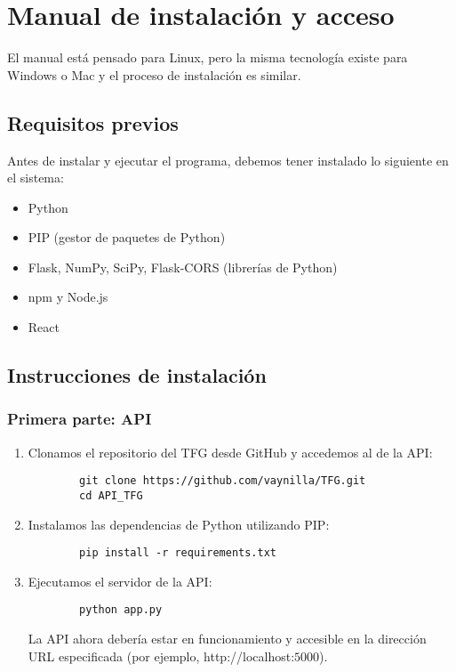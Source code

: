 \chapter{Manual de instalación y acceso}\label{ap:apendice1}
El manual está pensado para Linux, pero la misma tecnología existe para Windows o Mac y el proceso de instalación es similar.
\section{Requisitos previos}
Antes de instalar y ejecutar el programa, debemos tener instalado lo siguiente en el sistema:
\begin{itemize}
	\item Python
	\item PIP (gestor de paquetes de Python)
	\item Flask, NumPy, SciPy, Flask-CORS (librerías de Python)
	\item npm y Node.js
	\item React
\end{itemize}
\section{Instrucciones de instalación}
\subsection{Primera parte: API}
\begin{enumerate}
	\item Clonamos el repositorio del TFG desde GitHub y accedemos al de la API:
	\begin{verbatim}
		git clone https://github.com/vaynilla/TFG.git
		cd API_TFG
	\end{verbatim}
	\item Instalamos las dependencias de Python utilizando PIP:
	\begin{verbatim}
		pip install -r requirements.txt
	\end{verbatim}
	\item Ejecutamos el servidor de la API:
	\begin{verbatim}
		python app.py
	\end{verbatim}
	La API ahora debería estar en funcionamiento y accesible en la dirección URL especificada (por ejemplo, http://localhost:$5000$).
\end{enumerate}

